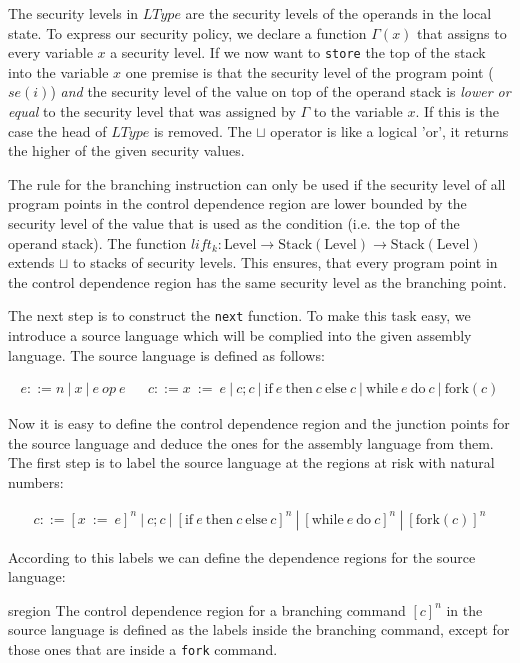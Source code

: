 \documentclass[a4paper,10pt]{llncs}
\begin{document}
The security levels in $LType$ are the security levels of the operands in the local state. To
express our security policy, we declare a function $\Gamma(x)$ that assigns to every variable
$x$ a security level. If we now want to \texttt{store} the top of the stack into the variable
$x$ one premise is that the security level of the program point ($se(i)$) \textit{and} the
security level of the value on top of the operand stack is \textit{lower or equal} to the
security level that was assigned by $\Gamma$ to the variable $x$. If this is the case the head
of $LType$ is removed. The $\sqcup$ operator is like a logical 'or', it returns the higher of
the given security values.

The rule for the branching instruction can only be used if the security level of all program
points in the control dependence region are lower bounded by the security level of the value
that is used as the condition (i.e. the top of the operand stack). The function $lift_k :
\text{Level} \rightarrow \text{Stack}(\text{Level}) \rightarrow \text{Stack}(\text{Level})$
extends $\sqcup$ to stacks of security levels. This ensures, that every program point in the control
dependence region has the same security level as the branching point.

The next step is to construct the \texttt{next} function. To make this task easy, we introduce
a source language which will be complied into the given assembly language. The source language
is defined as follows:

\begin{align*}
e ::= n\ |\ x\ |\ e\ op\ e && c ::= x\ :=\ e\ |\ c;c\ |\ \text{if}\ e\ \text{then}\ c\ \text{else}\ c\ |\ \text{while}\ e\ \text{do}\ c\ |\ \text{fork}(c)
\end{align*}

Now it is easy to define the control dependence region and the junction points for the source
language and deduce the ones for the assembly language from them. The first step is to label the
source language at the regions at risk with natural numbers:

\begin{align*}
c ::= [x\ :=\ e]^n\ |\ c;c\ |\ [\text{if}\ e\ \text{then}\ c\ \text{else}\ c]^n\ |\ [\text{while}\ e\ \text{do}\ c]^n\ |\ [\text{fork}(c)]^n
\end{align*}

According to this labels we can define the dependence regions for the source language:

\begin{definition}{sregion}
The control dependence region for a branching command $[c]^n$ in the source language is
defined as the labels inside the branching command, except for those ones that are inside a
\texttt{fork} command.
\end{definition}
\end{document}
